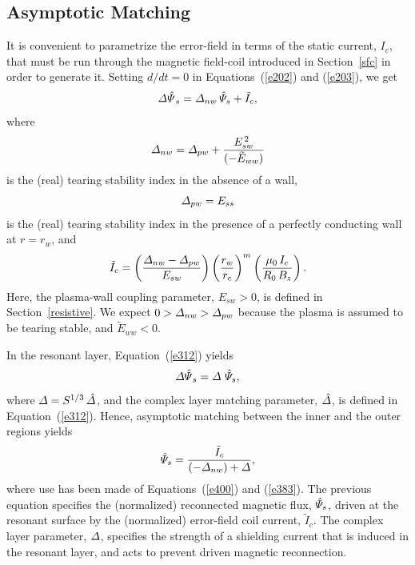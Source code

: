 \documentclass[notitlepage,12pt]{article}
\begin{document}
\subsection{Asymptotic Matching}
It is convenient to parametrize the error-field in terms of the static current, $I_c$, that must be run through the magnetic
field-coil introduced in Section~\ref{sfc} in order to generate it. Setting $d/dt=0$ in Equations~(\ref{e202}) and (\ref{e203}),
we get
\begin{equation}\label{e400}
{\mit\Delta\hat{\Psi}}_s = {\mit\Delta}_{nw}\,\hat{\mit\Psi}_s+\tilde{I}_c,
\end{equation}
where
\begin{equation}\label{enw}
{\mit\Delta}_{nw} = {\mit\Delta}_{pw} + \frac{E_{sw}^{\,2}}{(-\tilde{E}_{ww})}
\end{equation}
is the (real) tearing stability index in the absence of a wall, 
\begin{equation}\label{epw}
{\mit\Delta}_{pw}= E_{ss}
\end{equation}
 is the
(real) tearing stability index in the presence of a perfectly conducting wall at $r=r_w$, and
\begin{equation}
\tilde{I}_c =\left(\frac{{\mit\Delta}_{nw} - {\mit\Delta}_{pw}}{E_{sw}}\right)\left(
\frac{r_w}{r_c}\right)^m\left(\frac{\mu_0\,I_c}{R_0\,B_z}\right).
\end{equation}
Here, the plasma-wall coupling parameter, $E_{sw}>0$, is defined in Section~\ref{resistive}. We expect $0>{\mit\Delta}_{nw}>
{\mit\Delta}_{pw}$ because the plasma is assumed to be tearing stable, and $\tilde{E}_{ww}<0$. 

In the resonant layer, Equation~(\ref{e312}) yields
\begin{equation}\label{e383}
{\mit\Delta\hat{\Psi}}_s = {\mit\Delta}\,\,\hat{\mit\Psi}_s,
\end{equation}
where ${\mit\Delta} = S^{1/3}\,\hat{\mit\Delta}$, and the complex layer matching parameter, $\hat{\mit\Delta}$, is defined in 
Equation~(\ref{e312}). 
Hence, asymptotic matching between the inner and the outer regions yields
\begin{equation}\label{e384}
\hat{\mit\Psi}_s = \frac{\tilde{I}_c}{(-{\mit\Delta}_{nw}) + {\mit\Delta}},
\end{equation}
where use has been made of Equations~(\ref{e400}) and (\ref{e383}). 
The previous equation specifies the (normalized) reconnected magnetic flux, $\hat{\mit\Psi}_s$, driven at the resonant surface by the (normalized) 
error-field coil current, $\tilde{I}_c$. The complex layer parameter, ${\mit\Delta}$, specifies the strength of a shielding current
that is induced in the resonant layer, and acts to prevent driven magnetic reconnection. 
\end{document}
